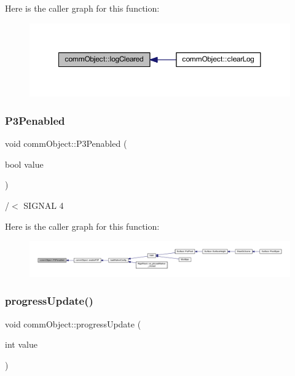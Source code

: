 Here is the caller graph for this function\+:\nopagebreak
\begin{figure}[H]
\begin{center}
\leavevmode
\includegraphics[width=350pt]{classcomm_object_af2304085624c26230e9d930d616e3e19_icgraph}
\end{center}
\end{figure}
\mbox{\label{classcomm_object_af369de87a7f2c9b7170223bedd6c08d9}} 
\subsubsection{P3\+Penabled}
{\footnotesize\ttfamily void comm\+Object\+::\+P3\+Penabled (\begin{DoxyParamCaption}\item[{bool}]{value }\end{DoxyParamCaption})\hspace{0.3cm}{\ttfamily [signal]}}



/$<$ S\+I\+G\+N\+AL 4 

Here is the caller graph for this function\+:\nopagebreak
\begin{figure}[H]
\begin{center}
\leavevmode
\includegraphics[width=350pt]{classcomm_object_af369de87a7f2c9b7170223bedd6c08d9_icgraph}
\end{center}
\end{figure}
\mbox{\label{classcomm_object_acfc97f4310e2b7d841ecb8cf8be0088e}} 
\subsubsection{progress\+Update()}
{\footnotesize\ttfamily void comm\+Object\+::progress\+Update (\begin{DoxyParamCaption}\item[{int}]{value }\end{DoxyParamCaption})}

